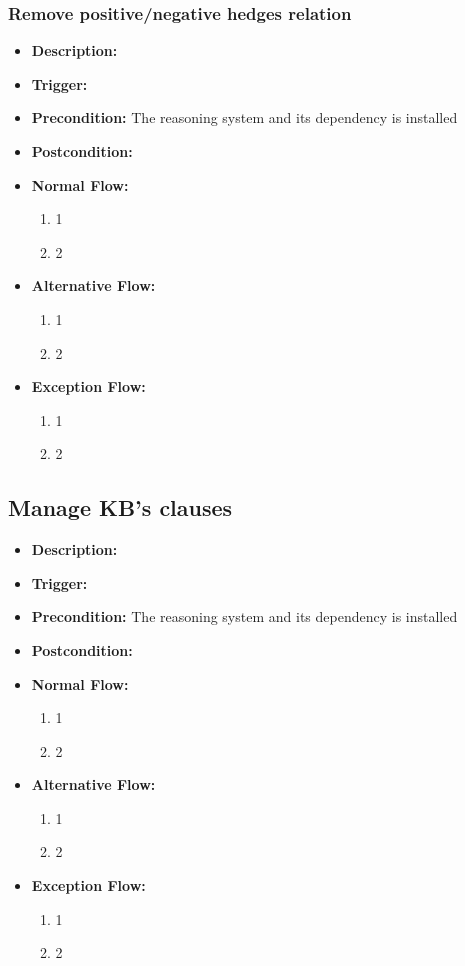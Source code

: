 \documentclass[../gr-final.tex]{subfiles}
\begin{document}
\subsubsection{Remove positive/negative hedges relation}
\begin{itemize}
  \item {\bfseries Description:} 
  \item {\bfseries Trigger:}
  \item {\bfseries Precondition:} The reasoning system and its
    dependency is installed
    
  \item {\bfseries Postcondition:}

  \item {\bfseries Normal Flow:}
    \begin{enumerate}
      \item 1
      \item 2
    \end{enumerate}
  \item {\bfseries Alternative Flow:}
    \begin{enumerate}
      \item 1
      \item 2
    \end{enumerate}
  \item {\bfseries Exception Flow:}
    \begin{enumerate}
      \item 1
      \item 2
    \end{enumerate}
\end{itemize}
\subsection{Manage KB's clauses}
\begin{itemize}
  \item {\bfseries Description:} 
  \item {\bfseries Trigger:}
  \item {\bfseries Precondition:} The reasoning system and its
    dependency is installed
    
  \item {\bfseries Postcondition:}

  \item {\bfseries Normal Flow:}
    \begin{enumerate}
      \item 1
      \item 2
    \end{enumerate}
  \item {\bfseries Alternative Flow:}
    \begin{enumerate}
      \item 1
      \item 2
    \end{enumerate}
  \item {\bfseries Exception Flow:}
    \begin{enumerate}
      \item 1
      \item 2
    \end{enumerate}
\end{itemize}
\end{document}
